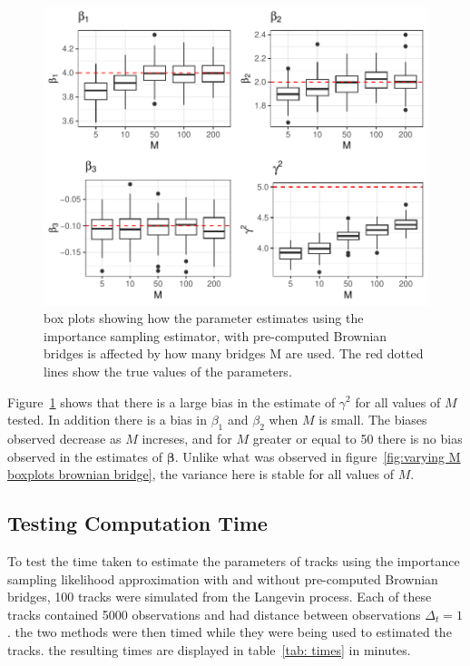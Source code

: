 \begin{figure}[H]
    \centering
    \includegraphics[width=\linewidth]{Images/Results/varying M estimates boxplot precomputed BB.pdf}
    \caption[Box plots of Parameter Estimates using pre-computed Brownian bridge importance sampling using different numbers of bridges]{box plots showing how the parameter estimates using the importance sampling estimator, with pre-computed Brownian bridges is affected by how many bridges M are used. The red dotted lines show the true values of the parameters.}
    \label{fig:varying M boxplots precomputed brownian bridge}
\end{figure}

Figure~\ref{fig:varying M boxplots precomputed brownian bridge} shows that there is a large bias in the estimate of $\gamma^2$ for all values of $M$ tested. In addition there is a bias in $\beta_1$ and $\beta_2$ when $M$ is small. The biases observed decrease as $M$ increses, and for $M$ greater or equal to 50 there is no bias observed in the estimates of $\bm \beta$. Unlike what was observed in figure~\ref{fig:varying M boxplots brownian bridge}, the variance here is stable for all values of $M$.


\subsection{Testing Computation Time}
To test the time taken to estimate the parameters of tracks using the importance sampling likelihood approximation with and without pre-computed Brownian bridges, 100 tracks were simulated from the Langevin process. Each of these tracks contained 5000 observations and had distance between observations $\Delta_t = 1$. the two methods were then timed while they were being used to estimated the tracks. the resulting times are displayed in table~\ref{tab: times} in minutes.



